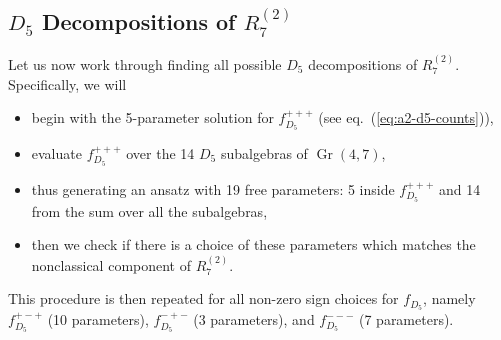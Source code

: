 \documentclass[11pt]{article}
\DeclareMathOperator{\Gr}{Gr}
\def\pdfeq#1{\texorpdfstring{$#1$}{a}}
\begin{document}
\subsection{\pdfeq{D_5} Decompositions of \pdfeq{R^{(2)}_7}}\label{sec:d5-func}

Let us now work through finding all possible $D_5$ decompositions of $R^{(2)}_7$. Specifically, we will
\begin{itemize}
	\item begin with the 5-parameter solution for $f_{D_5}^{+++}$ (see eq.~(\ref{eq:a2-d5-counts})),
	\item evaluate $f_{D_5}^{+++}$ over the 14 $D_5$ subalgebras of $\Gr(4,7)$,
	\item thus generating an ansatz with 19 free parameters: 5 inside $f_{D_5}^{+++}$ and 14 from the sum over all the subalgebras,
	\item then we check if there is a choice of these parameters which matches the nonclassical component of $R^{(2)}_7$.
\end{itemize}
This procedure is then repeated for all non-zero sign choices for $f_{D_5}$, namely $f_{D_5}^{+-+}$ (10 parameters), $f_{D_5}^{-+-}$ (3 parameters), and $f_{D_5}^{---}$ (7 parameters). 
\end{document}
